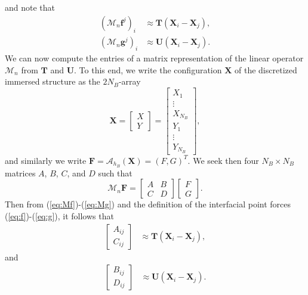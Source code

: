 \documentclass[preprint,12pt]{elsarticle}
\begin{document}
 and note that
 \begin{align}
(\mathcal{M}_n \mathbf{f}^j)_i & \approx \mathbf{T}(\mathbf{X}_i -\mathbf{X}_j), \label{eq:Mf}\\
(\mathcal{M}_n \mathbf{g}^j)_i & \approx \mathbf{U}(\mathbf{X}_i -\mathbf{X}_j). \label{eq:Mg}
\end{align}
We can now compute the entries of a matrix representation of the linear operator $\mathcal{M}_n$ from $\mathbf{T}$ and 
$\mathbf{U}$. To this end, we write the configuration $\mathbf{X}$ of the discretized immersed structure as the $2N_B$-array 
\begin{equation}
\mathbf{X}=\begin{bmatrix} X \\ Y \end{bmatrix} =
 \begin{bmatrix} X_1 \\ \vdots \\ X_{N_B} \\Y_1 \\ \vdots \\Y_{N_B}
\end{bmatrix} ,
\end{equation}
and similarly we write  $\mathbf{F}=\mathcal{A}_{h_B}(\mathbf{X})=(F,G)^T$. We seek then four $N_B\times N_B$ matrices $A$, $B$, $C$, and $D$ such that
\begin{equation}
\mathcal{M}_n\mathbf{F} =
\begin{bmatrix}
A & B \\
C & D \end{bmatrix}
\begin{bmatrix}
F  \\
G \end{bmatrix} . \label{eq:ABCD}
\end{equation}
Then from (\ref{eq:Mf})-(\ref{eq:Mg}) and the definition of the interfacial point forces (\ref{eq:f})-(\ref{eq:g}), it follows that
\begin{align}
\begin{bmatrix} A_{ij} \\ C_{ij} \end{bmatrix}
&\approx \mathbf{T}(\mathbf{X}_i-\mathbf{X}_j),
\end{align}
and
\begin{align}
\begin{bmatrix} B_{ij} \\ D_{ij} \end{bmatrix}
&\approx \mathbf{U}(\mathbf{X}_i-\mathbf{X}_j).
\end{align}
\end{document}
